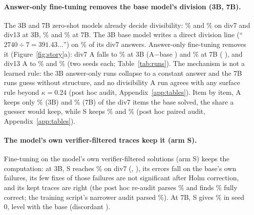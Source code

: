 \documentclass{article}
\theoremstyle{definition}
\begin{document}
\paragraph{Answer-only fine-tuning removes the base model's division (3B, 7B).} The 3B and 7B zero-shot models already decide divisibility: \threeBdivsevenBase\% and \threeBdivthirteenBase\% on div7 and div13 at 3B, \sevenBdivsevenBase\% and \sevenBdivthirteenBase\% at 7B. The 3B base model writes a direct division line (``$2740 \div 7 = 391.43\ldots$'') on \threeBbasedivsevenDirect\% of its div7 answers. Answer-only fine-tuning removes it (Figure~\ref{fig:story}a): div7 A falls to \threeBdivsevenA\% at 3B (A$-$base \threeBdivsevenBootABaseDiff{} \threeBdivsevenBootABaseCi) and \sevenBdivsevenA\% at 7B (\sevenBdivsevenBootABaseDiff{} \sevenBdivsevenBootABaseCi), and div13 A to \threeBdivthirteenA\% and \sevenBdivthirteenA\% (two seeds each; Table~\ref{tab:runs}). The mechanism is not a learned rule: the 3B answer-only runs collapse to a constant answer and the 7B runs guess without structure, and no divisibility A run agrees with any surface rule beyond $\kappa=0.24$ (post hoc audit, Appendix~\ref{app:tables}). Item by item, A keeps only \erThreeBdivsevenAkeep\% (3B) and \erSevenBdivsevenAkeep\% (7B) of the div7 items the base solved, the share a guesser would keep, while S keeps \erThreeBdivsevenSkeep\% and \erSevenBdivsevenSkeep\% (post hoc paired audit, Appendix~\ref{app:tables}).

\paragraph{The model's own verifier-filtered traces keep it (arm S).} Fine-tuning on the model's own verifier-filtered solutions (arm S) keeps the computation: at 3B, S reaches \threeBdivsevenS\% on div7 (\threeBdivsevenSsZero, \threeBdivsevenSsOne), its errors fall on the base's own failures, its few fixes of those failures are not significant after Holm correction, and its kept traces are right (the post hoc re-audit parses \threeBselfParsedExt\% and finds \threeBselfCorrectParsedExt\% fully correct; the training script's narrower audit parsed \threeBselfParsed\%). At 7B, S gives \sevenBdivsevenSsZero\% in seed 0, level with the base (discordant \sevenBdivsevenSBaseDisc).
\end{document}
